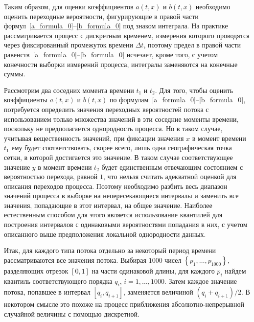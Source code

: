 Таким образом, для оценки коэффициентов $a(t,x)$ и $b(t,x)$ необходимо оценить переходные вероятности, фигурирующие в правой части формул~\eqref{a_formula_0}--\eqref{b_formula_0} под знаком интеграла. На практике рассматривается процесс с дискретным временем, измерения которого проводятся через фиксированный промежуток времени $\varDelta t$, поэтому предел в правой части равенств~\eqref{a_formula_0}--\eqref{b_formula_0} исчезает, кроме того, с учетом конечности выборки измерений процесса, интегралы заменяются на конечные суммы.

Рассмотрим два соседних момента времени $t_1$ и $t_2$. Для того, чтобы оценить коэффициенты $a(t,x)$ и $b(t,x)$ по формулам~\eqref{a_formula_0}--\eqref{b_formula_0}, потребуется определить значения переходных вероятностей потока с использованием только множества значений в эти соседние моменты времени, поскольку не предполагается однородность процесса. Но в таком случае, учитывая вещественность значений, при фиксации значения $x$ в момент времени $t_1$ ему будет соответствовать, скорее всего, лишь одна географическая точка сетки, в которой достигается это значение. В таком случае соответствующее значение $y$ в момент времени $t_2$ будет единственным отвечающим состоянием с вероятностью перехода, равной $1$, что нельзя считать адекватной оценкой для описания переходов процесса. Поэтому необходимо разбить весь диапазон значений процесса в выборке на непересекающиеся интервалы и заменить все значения, попадающие в этот интервал, на общее значение. Наиболее естественным способом для этого является использование квантилей для построения интервалов с одинаковыми вероятностями попадания в них, с учетом описанного выше предположения локальной однородности данных.

Итак, для каждого типа потока отдельно за некоторый период времени рассматриваются все значения потока. Выбирая $1000$ чисел $\left\lbrace p_1, \ldots, p_{1000} \right\rbrace $, разделяющих  отрезок $[0, 1]$ на части одинаковой длины, для каждого $p_i$ найдем квантиль соответствующего порядка $q_i$, $i=1, \ldots, 1000$. Затем каждое значение потока, попавшее в интервал $[q_i, q_{i+1}]$, заменяется величиной $(q_i + q_{i+1})/2$. В некотором смысле это похоже на процесс приближения абсолютно-непрерывной случайной величины с помощью дискретной.

